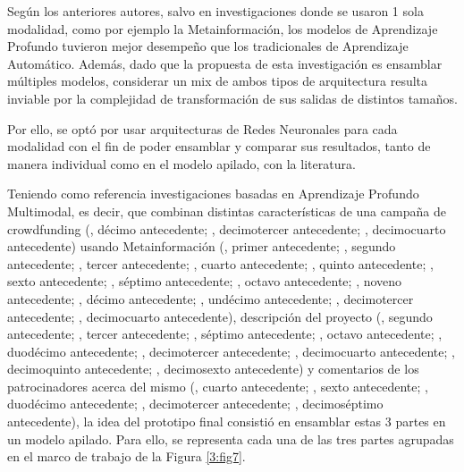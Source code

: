 Según los anteriores autores, salvo en investigaciones donde se usaron 1 sola modalidad, como por ejemplo la Metainformación, los modelos de Aprendizaje Profundo tuvieron mejor desempeño que los tradicionales de Aprendizaje Automático. Además, dado que la propuesta de esta investigación es ensamblar múltiples modelos, considerar un mix de ambos tipos de arquitectura resulta inviable por la complejidad de transformación de sus salidas de distintos tamaños.

Por ello, se optó por usar arquitecturas de Redes Neuronales para cada modalidad con el fin de poder ensamblar y comparar sus resultados, tanto de manera individual como en el modelo apilado, con la literatura.

Teniendo como referencia investigaciones basadas en Aprendizaje Profundo Multimodal, es decir, que combinan distintas características de una campaña de crowdfunding (\cite{pr_kamath2018suplearn}, décimo antecedente; \cite{pr_jin2019dayssuccess}, decimotercer antecedente; \cite{pr_cheng2019deeplearning}, decimocuarto antecedente) usando Metainformación (\cite{pr_chen2013kickpredict}, primer antecedente; \cite{pr_mitra2014phrases}, segundo antecedente; \cite{pr_zhou2015projectdesc}, tercer antecedente; \cite{pr_chen2015predcrowd}, cuarto antecedente; \cite{pr_beckwith2016predcrowd}, quinto antecedente; \cite{pr_li2016predcrowd}, sexto antecedente; \cite{pr_yuan2016textanalytics}, séptimo antecedente; \cite{pr_sawhney2016usingLT}, octavo antecedente; \cite{pr_kaur2017socmedcrowd}, noveno antecedente; \cite{pr_kamath2018suplearn}, décimo antecedente; \cite{pr_yu2018deeplearning}, undécimo antecedente; \cite{pr_jin2019dayssuccess}, decimotercer antecedente; \cite{pr_cheng2019deeplearning}, decimocuarto antecedente), descripción del proyecto (\cite{pr_mitra2014phrases}, segundo antecedente; \cite{pr_zhou2015projectdesc}, tercer antecedente; \cite{pr_yuan2016textanalytics}, séptimo antecedente; \cite{pr_sawhney2016usingLT}, octavo antecedente; \cite{pr_lee2018contentDL}, duodécimo antecedente; \cite{pr_jin2019dayssuccess}, decimotercer antecedente; \cite{pr_cheng2019deeplearning}, decimocuarto antecedente; \cite{pr_chen2019keywords_crowdfunding}, decimoquinto antecedente; \cite{pr_chaichi2019nlp_3dprinting}, decimosexto antecedente) y comentarios de los patrocinadores acerca del mismo (\cite{pr_chen2015predcrowd}, cuarto antecedente; \cite{pr_li2016predcrowd}, sexto antecedente; \cite{pr_lee2018contentDL}, duodécimo antecedente; \cite{pr_jin2019dayssuccess}, decimotercer antecedente; \cite{pr_shafqat2019topicpredictions}, decimoséptimo antecedente), la idea del prototipo final consistió en ensamblar estas 3 partes en un modelo apilado. Para ello, se representa cada una de las tres partes agrupadas en el marco de trabajo de la Figura \ref{3:fig7}.
